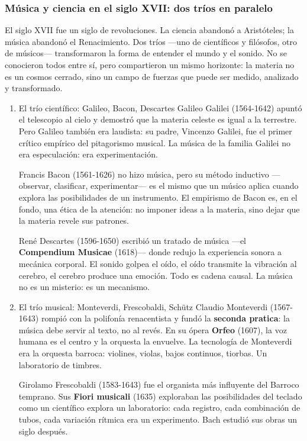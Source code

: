 \documentclass[14pt, a4paper]{article}
\begin{document}
\subsubsection{Música y ciencia en el siglo XVII: dos tríos en paralelo}
\label{trios-siglo-xvii}
El siglo XVII fue un siglo de revoluciones. La ciencia abandonó a
Aristóteles; la música abandonó el Renacimiento. Dos tríos —uno de
científicos y filósofos, otro de músicos— transformaron la forma de
entender el mundo y el sonido. No se conocieron todos entre sí, pero
compartieron un mismo horizonte: la materia no es un cosmos cerrado,
sino un campo de fuerzas que puede ser medido, analizado y
transformado.
\begin{enumerate}
\item El trío científico: Galileo, Bacon, Descartes
\label{trio-cientifico}
Galileo Galilei (1564-1642) apuntó el telescopio al cielo y demostró
que la materia celeste es igual a la terrestre. Pero Galileo también
era laudista: su padre, Vincenzo Galilei, fue el primer crítico
empírico del pitagorismo musical. La música de la familia Galilei no
era especulación: era experimentación.

Francis Bacon (1561-1626) no hizo música, pero su método inductivo
—observar, clasificar, experimentar— es el mismo que un músico aplica
cuando explora las posibilidades de un instrumento. El empirismo de
Bacon es, en el fondo, una ética de la atención: no imponer ideas a la
materia, sino dejar que la materia revele sus patrones.

René Descartes (1596-1650) escribió un tratado de música —el
\textbf{Compendium Musicae} (1618)— donde redujo la experiencia sonora a
mecánica corporal. El sonido golpea el oído, el oído transmite la
vibración al cerebro, el cerebro produce una emoción. Todo es cadena
causal. La música no es un misterio: es un mecanismo.
\item El trío musical: Monteverdi, Frescobaldi, Schütz
\label{trio-musical}
Claudio Monteverdi (1567-1643) rompió con la polifonía renacentista y
fundó la \textbf{seconda pratica}: la música debe servir al texto, no al
revés. En su ópera \textbf{Orfeo} (1607), la voz humana es el centro y la
orquesta la envuelve. La tecnología de Monteverdi era la orquesta
barroca: violines, violas, bajos continuos, tiorbas. Un laboratorio de
timbres.

Girolamo Frescobaldi (1583-1643) fue el organista más influyente del
Barroco temprano. Sus \textbf{Fiori musicali} (1635) exploraban las
posibilidades del teclado como un científico explora un laboratorio:
cada registro, cada combinación de tubos, cada variación rítmica era
un experimento. Bach estudió sus obras un siglo después.


\end{enumerate}
\end{document}
